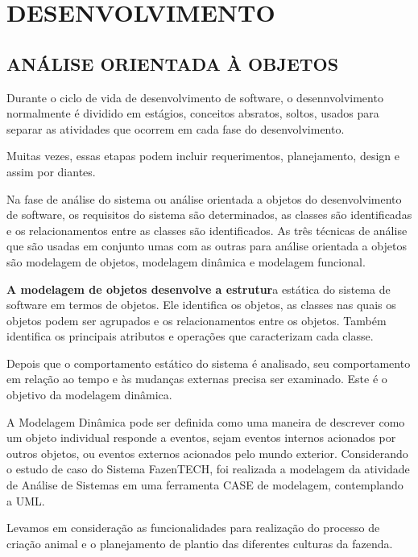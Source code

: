 
\chapter{DESENVOLVIMENTO}
\section{ANÁLISE ORIENTADA À OBJETOS}
\label{sec:desenvolvimento}

Durante o ciclo de vida de desenvolvimento de software, o desennvolvimento normalmente é dividido em estágios, conceitos absratos, soltos, usados para separar as atividades que ocorrem em cada fase do desenvolvimento.

Muitas vezes, essas etapas podem incluir requerimentos, planejamento, design e assim por diantes.

Na fase de análise do sistema ou análise orientada a objetos do desenvolvimento de software, os requisitos do sistema são determinados, as classes são identificadas e os relacionamentos entre as classes são identificados.
As três técnicas de análise que são usadas em conjunto umas com as outras para análise orientada a objetos são modelagem de objetos, modelagem dinâmica e modelagem funcional.

\textbf{A modelagem de objetos desenvolve a estrutur}a estática do sistema de software em termos de objetos. Ele identifica os objetos, as classes nas quais os objetos podem ser agrupados e os relacionamentos entre os objetos. Também identifica os principais atributos e operações que caracterizam cada classe.

Depois que o comportamento estático do sistema é analisado, seu comportamento em relação ao tempo e às mudanças externas precisa ser examinado. Este é o objetivo da modelagem dinâmica.

A Modelagem Dinâmica pode ser definida como uma maneira de descrever como um objeto individual responde a eventos, sejam eventos internos acionados por outros objetos, ou eventos externos acionados pelo mundo exterior.
Considerando o estudo de caso do Sistema FazenTECH, foi realizada a modelagem da atividade de Análise de Sistemas em uma ferramenta CASE de modelagem, contemplando a UML. 

Levamos em consideração as funcionalidades para realização do processo de criação animal e o planejamento de plantio das diferentes culturas da fazenda.

